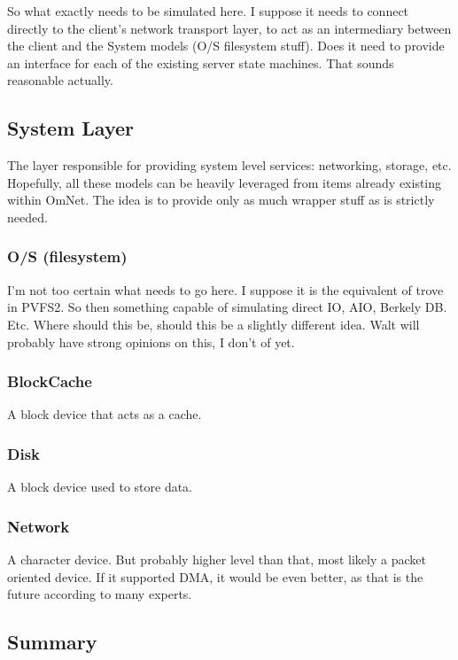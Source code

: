 \documentclass[11pt]{article}
\begin{document}
So what exactly needs to be simulated here.  I suppose it needs to connect
directly to the client's network transport layer, to act as an intermediary
between the client and the System models (O/S filesystem stuff).  Does it need
to provide an interface for each of the existing server state machines.  That
sounds reasonable actually.

\subsection{System Layer}
The layer responsible for providing system level services: networking,
storage, etc.  Hopefully, all these models can be heavily leveraged from items
already existing within OmNet.  The idea is to provide only as much wrapper
stuff as is strictly needed.

\subsubsection{O/S (filesystem)}
I'm not too certain what needs to go here.  I suppose it is the equivalent of
trove in PVFS2.  So then something capable of simulating direct IO, AIO,
Berkely DB.  Etc.  Where should this be, should this be a slightly different
idea.  Walt will probably have strong opinions on this, I don't of yet.

\subsubsection{BlockCache}
A block device that acts as a cache.

\subsubsection{Disk}
A block device used to store data.

\subsubsection{Network}
A character device.  But probably higher level than that, most likely a packet
oriented device.  If it supported  DMA, it would be even better, as that is
the future according to many experts.

\subsection{Summary}
\end{document}
